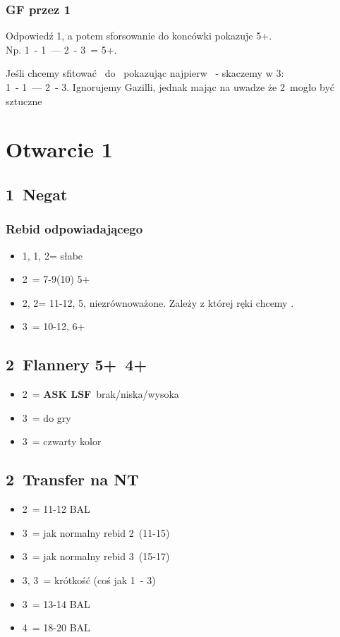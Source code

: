 \documentclass[12pt, a4paper]{article}
\newcommand{\lsf}{\color{WildStrawberry}\textbf{ASK LSF}\color{black}}
\begin{document}
\subsubsection*{GF przez 1\spades}
    Odpowiedź 1\spades, a potem sforsowanie do koncówki pokazuje 5+\spades. \\
    Np. 1\diams\ - 1\spades\ --- 2\diams\ - 3\clubs\ = 5+\spades. \br

    Jeśli chcemy sfitować \hearts\ do \gf\ pokazując najpierw \spades\ - skaczemy w 3\hearts:\\
    1\hearts\ - 1\spades\ --- 2\clubs\ - 3\hearts. Ignorujemy Gazilli, jednak mając na uwadze że 2\clubs\ mogło być sztuczne

\pagebreak
\section{Otwarcie 1\clubs}
\subsection*{1\diams\ Negat}
\subsubsection*{Rebid odpowiadającego}
\begin{itemize}
    \item 1\spades, 1\nt, 2\clubs = słabe
    \item 2\diams\ = 7-9(10) 5+\diams
    \item 2\spades, 2\nt = 11-12, 5\diams, niezrównoważone. Zależy z której ręki chcemy \nt.
    \item 3\diams\ = 10-12, 6+\diams
\end{itemize}

\subsection*{2\hearts\ Flannery 5+\spades\ 4+\hearts}
\begin{itemize}
    \item 2\nt\ = \lsf\ brak/niska/wysoka
    \item 3\clubs\ = do gry
    \item 3\diams\ = czwarty kolor \gf
\end{itemize}

\subsection*{2\spades\ Transfer na NT}
\begin{itemize}
    \item 2\nt\ = 11-12 BAL
    \item 3\clubs\ = jak normalny rebid 2\clubs\ (11-15)
    \item 3\diams\ = jak normalny rebid 3\clubs\ (15-17)
    \item 3\hearts, 3\spades\ = krótkość (coś jak 1\nt\ - 3\hearts)
    \item 3\nt\ = 13-14 BAL
    \item 4\nt\ = 18-20 BAL
\end{itemize}
\end{document}
